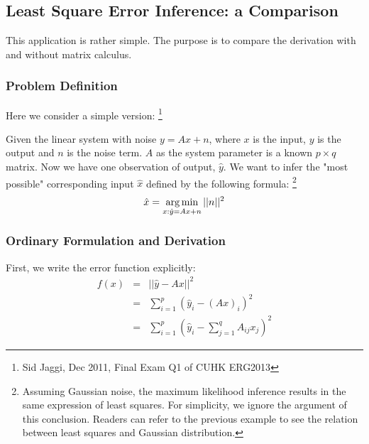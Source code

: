 \subsection{Least Square Error Inference: a Comparison}
\label{sec:lse}

This application is rather simple. The purpose is
to compare the derivation with and without matrix 
calculus. 

\subsubsection{Problem Definition}

Here we consider a simple version:
\footnote{Sid Jaggi, Dec 2011, Final Exam Q1 of CUHK ERG2013}

Given the linear system with noise $y=Ax+n$, where $x$ is the input, 
$y$ is the output and $n$ is the noise term. $A$ as the system 
parameter is a known $p \times q$ matrix. 
Now we have one observation of output, $\hat{y}$. 
We want to infer the "most possible" corresponding input $\hat{x}$
defined by the following formula:
\footnote{Assuming Gaussian noise, the maximum likelihood inference results
in the same expression of least squares. For simplicity, we ignore the argument
of this conclusion. Readers can refer to the previous example to 
see the relation between least squares and Gaussian distribution.}
\begin{equation}
	\hat{x} = \operatorname*{arg\,min}_{x:\hat{y}=Ax+n}{||n||^2}
\end{equation}

\subsubsection{Ordinary Formulation and Derivation}

First, we write the error function explicitly:
\begin{eqnarray}
	f(x) &=& ||\hat{y} - Ax||^2 \\
	&=& \sum_{i=1}^{p}{(\hat{y}_i - (Ax)_i)^2} \\
	&=& \sum_{i=1}^{p}{(\hat{y}_i - \sum_{j=1}^{q}{A_{ij}x_j} )^2}
\end{eqnarray}

